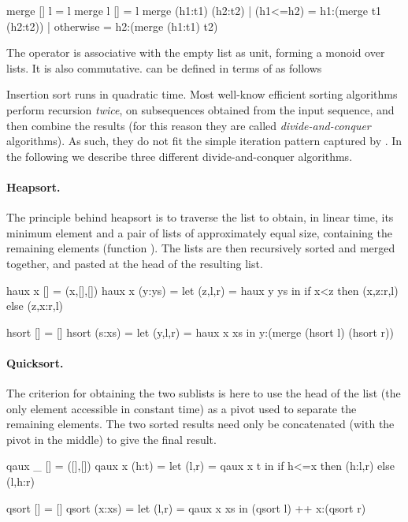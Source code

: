 \documentclass[a4paper,11pt]{llncs}
\begin{document}
\begin{code}
merge [] l = l
merge l [] = l
merge (h1:t1) (h2:t2) 
      | (h1<=h2)  = h1:(merge t1 (h2:t2))
      | otherwise = h2:(merge (h1:t1) t2)
\end{code}
The operator  is associative with the empty list as unit,
forming a monoid over lists.  It is also commutative.  can
be defined in terms of  as follows


Insertion sort runs in quadratic time.  Most well-know efficient
sorting algorithms perform recursion \emph{twice}, on subsequences
obtained from the input sequence, and then combine the results (for
this reason they are called \emph{divide-and-conquer} algorithms). As
such, they do not fit the simple iteration pattern captured by
.
In the following we describe three different divide-and-conquer
algorithms.  

\paragraph{Heapsort.} The principle behind heapsort is to traverse the
list to obtain, in linear time, its minimum element  and a pair of
lists of approximately equal size, containing the remaining elements
(function ). The lists are then recursively sorted and merged
together, and  pasted at the head of the resulting list.
\begin{code}
haux x [] = (x,[],[])
haux x (y:ys) = let (z,l,r) = haux y ys
                in if x<z then (x,z:r,l) else (z,x:r,l)

hsort []     = []
hsort (s:xs) = let (y,l,r) = haux x xs
               in y:(merge (hsort l) (hsort r))
\end{code}


\paragraph{Quicksort.} The criterion for obtaining the two sublists is
here to use the head of the list (the only element accessible in
constant time) as a pivot used to separate the remaining elements. The
two sorted results need only be concatenated (with the pivot in the
middle) to give the final result. 

\begin{code}
qaux _ []    = ([],[])
qaux x (h:t) = let (l,r) = qaux x t
               in if h<=x then (h:l,r) else (l,h:r)

qsort []     = []
qsort (x:xs) = let (l,r) = qaux x xs 
               in (qsort l) ++ x:(qsort r)
\end{code}
\end{document}
